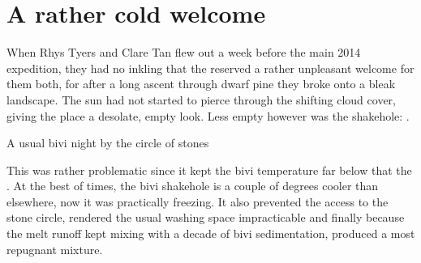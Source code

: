 

\section{A rather cold welcome}

When Rhys Tyers and Clare Tan flew out a week before the main 2014 expedition, they had no inkling that the  reserved a rather unpleasant welcome for them both, for after a long ascent through dwarf pine they broke onto a bleak landscape. The sun had not started to pierce through the shifting cloud cover, giving the place a desolate, empty look. Less empty however was the  shakehole: .


\begin{marginfigure}
\caption{A usual bivi night by the circle of stones } \label{}
\end{marginfigure}
This was rather problematic since it kept the bivi temperature far below that the . At the best of times, the bivi shakehole is a couple of degrees cooler than elsewhere, now it was practically freezing. It also prevented the access to the stone circle, rendered the usual washing space impracticable and finally because the melt runoff kept mixing with a decade of bivi sedimentation, produced a most repugnant mixture.

